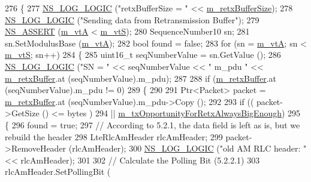 \begin{DoxyCode}
276     \{
277       \hyperlink{group__logging_ga88acd260151caf2db9c0fc84997f45ce}{NS\_LOG\_LOGIC} (\textcolor{stringliteral}{"retxBufferSize = "} << \hyperlink{classns3_1_1LteRlcAm_af270916ffd1805b027a7b9cc05c91e7d}{m\_retxBufferSize});      
278       \hyperlink{group__logging_ga88acd260151caf2db9c0fc84997f45ce}{NS\_LOG\_LOGIC} (\textcolor{stringliteral}{"Sending data from Retransmission Buffer"});
279       \hyperlink{assert_8h_a6dccdb0de9b252f60088ce281c49d052}{NS\_ASSERT} (\hyperlink{classns3_1_1LteRlcAm_a55514b9f03d8f70cdbb8cdac053f39b5}{m\_vtA} < \hyperlink{classns3_1_1LteRlcAm_a4efc8184c7973cb7b7c896ed514a7b06}{m\_vtS});
280       SequenceNumber10 sn;
281       sn.SetModulusBase (\hyperlink{classns3_1_1LteRlcAm_a55514b9f03d8f70cdbb8cdac053f39b5}{m\_vtA});
282       \textcolor{keywordtype}{bool} found = \textcolor{keyword}{false};
283       \textcolor{keywordflow}{for} (sn = \hyperlink{classns3_1_1LteRlcAm_a55514b9f03d8f70cdbb8cdac053f39b5}{m\_vtA}; sn < \hyperlink{classns3_1_1LteRlcAm_a4efc8184c7973cb7b7c896ed514a7b06}{m\_vtS}; sn++) 
284         \{
285           uint16\_t seqNumberValue = sn.GetValue ();
286           \hyperlink{group__logging_ga88acd260151caf2db9c0fc84997f45ce}{NS\_LOG\_LOGIC} (\textcolor{stringliteral}{"SN = "} << seqNumberValue << \textcolor{stringliteral}{" m\_pdu "} << 
      \hyperlink{classns3_1_1LteRlcAm_ab34bb5fce080a41395ad7ea5789af8d0}{m\_retxBuffer}.at (seqNumberValue).m\_pdu);
287 
288           \textcolor{keywordflow}{if} (\hyperlink{classns3_1_1LteRlcAm_ab34bb5fce080a41395ad7ea5789af8d0}{m\_retxBuffer}.at (seqNumberValue).m\_pdu != 0)
289             \{            
290 
291               Ptr<Packet> packet = \hyperlink{classns3_1_1LteRlcAm_ab34bb5fce080a41395ad7ea5789af8d0}{m\_retxBuffer}.at (seqNumberValue).m\_pdu->Copy ();
292               
293               \textcolor{keywordflow}{if} (( packet->GetSize () <= bytes )
294                   || \hyperlink{classns3_1_1LteRlcAm_a7f5585ee93a02f0fe8f9c3a2679a4866}{m\_txOpportunityForRetxAlwaysBigEnough})
295                 \{
296                   found = \textcolor{keyword}{true};
297                   \textcolor{comment}{// According to 5.2.1, the data field is left as is, but we rebuild the header}
298                   LteRlcAmHeader rlcAmHeader;
299                   packet->RemoveHeader (rlcAmHeader);
300                   \hyperlink{group__logging_ga88acd260151caf2db9c0fc84997f45ce}{NS\_LOG\_LOGIC} (\textcolor{stringliteral}{"old AM RLC header: "} << rlcAmHeader);
301 
302                   \textcolor{comment}{// Calculate the Polling Bit (5.2.2.1)}
303                   rlcAmHeader.SetPollingBit (

\end{DoxyCode}
